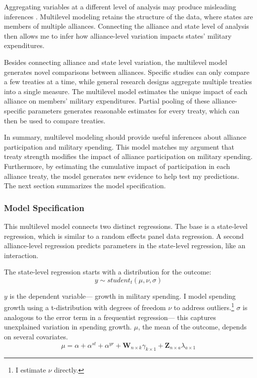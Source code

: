 \documentclass[12pt]{article}
\begin{document}
Aggregating variables at a different level of analysis may produce misleading inferences \citep{McElreath2016}. 
Multilevel modeling retains the structure of the data, where states are members of multiple alliances. 
Connecting the alliance and state level of analysis then allows me to infer how alliance-level variation impacts states' military expenditures. 


Besides connecting alliance and state level variation, the multilevel model generates novel comparisons between alliances. 
Specific studies can only compare a few treaties at a time, while general research designs aggregate multiple treaties into a single measure. 
The multilevel model estimates the unique impact of each alliance on members' military expenditures. 
Partial pooling of these alliance-specific parameters generates reasonable estimates for every treaty, which can then be used to compare treaties. 


In summary, multilevel modeling should provide useful inferences about alliance participation and military spending. 
This model matches my argument that treaty strength modifies the impact of alliance participation on military spending. 
Furthermore, by estimating the cumulative impact of participation in each alliance treaty, the model generates new evidence to help test my predictions. 
The next section summarizes the model specification. 
 


\subsubsection{Model Specification} 

This multilevel model connects two distinct regressions. 
The base is a state-level regression, which is similar to a random effects panel data regression.
A second alliance-level regression predicts parameters in the state-level regression, like an interaction. 


The state-level regression starts with a distribution for the outcome:
\begin{equation}
y \sim student_t(\mu, \nu, \sigma)
\end{equation}
 

$y$ is the dependent variable--- growth in military spending. 
I model spending growth using a t-distribution with degrees of freedom $\nu$ to address outliers.\footnote{I estimate $\nu$ directly.}
$\sigma$ is analogous to the error term in a frequentist regression--- this captures unexplained variation in spending growth.  
$\mu$, the mean of the outcome, depends on several covariates.
\begin{equation}
\mu = \alpha + \alpha^{st} + \alpha^{yr} +\textbf{W}_{n \times k} \gamma_{k \times 1}  + \textbf{Z}_{n \times a} \lambda_{a \times 1} 
\end{equation}
\end{document}

